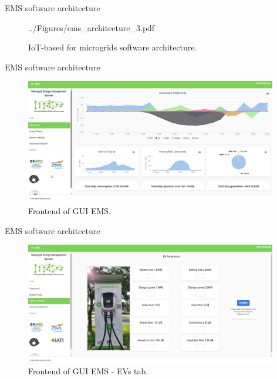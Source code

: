\documentclass[10pt, aspectratio=1610]{beamer}
\begin{document}
\begin{frame}{EMS software architecture}
\begin{figure}
{    {../Figures/ems_architecture_3.pdf}}
    \caption{IoT-based for microgrids software architecture.}
    \end{figure}
\end{frame}

\begin{frame}{EMS software architecture}
    \begin{figure}
        \includegraphics[width=0.98\textwidth]{../Figures/EMS/dashboard.jpg}
        \caption{Frontend of GUI EMS.}
    \end{figure}
\end{frame}

\begin{frame}{EMS software architecture}
    \begin{figure}
        \includegraphics[width=0.98\textwidth]{../Figures/EMS/EVs.png}
        \caption{Frontend of GUI EMS - EVs tab.}
    \end{figure}
\end{frame}
\end{document}
